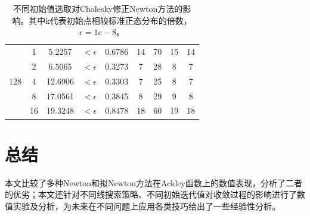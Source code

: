\documentclass{article}
\begin{document}
\begin{table}[h]
\begin{tabular}{c c c c c c c c c}
    \cmidrule(lr){1-9}
    \multirow{5}{*}{128} &
       1 &  5.2257 & $<\epsilon$ & 0.6786 & 14 & 70 & 15 & 14 \\
    &  2 &  6.5065 & $<\epsilon$ & 0.3273 &  7 & 28 &  8 & 7 \\
    &  4 & 12.6906 & $<\epsilon$ & 0.3303 &  7 & 25 &  8 & 7 \\
    &  8 & 17.0561 & $<\epsilon$ & 0.3845 &  8 & 29 &  9 & 8 \\
    & 16 & 19.3248 & $<\epsilon$ & 0.8478 & 18 & 60 & 19 & 18 \\
    \bottomrule
  \end{tabular}
  \caption{不同初始值选取对Cholesky修正Newton方法的影响。其中k代表初始点相较标准正态分布的倍数，$\epsilon=1e-8$。}
  \label{tab:init_value}
\end{table}


\section{总结}
本文比较了多种Newton和拟Newton方法在Ackley函数上的数值表现，分析了二者的优劣；本文还针对不同线搜索策略、不同初始迭代值对收敛过程的影响进行了数值实验及分析，为未来在不同问题上应用各类技巧给出了一些经验性分析。


\end{document}
